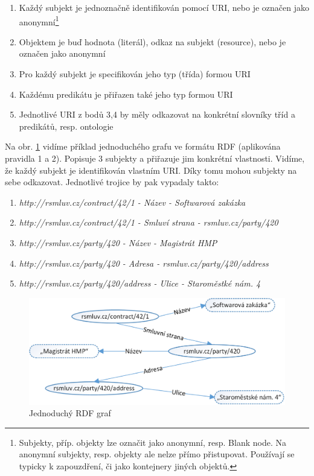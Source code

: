 \begin{enumerate}
\item Každý subjekt je jednoznačně identifikován pomocí URI, nebo je označen jako anonymní\footnote{Subjekty, příp. objekty lze označit jako anonymní, resp. Blank node. Na anonymní subjekty, resp. objekty ale nelze přímo přistupovat. Používají se typicky k zapouzdření, či jako kontejnery jiných objektů.} 
\item Objektem je buď hodnota (literál), odkaz na subjekt (resource), nebo je označen jako anonymní
\item Pro každý subjekt je specifikován jeho typ (třída) formou URI
\item Každému predikátu je přiřazen také jeho typ formou URI
\item Jednotlivé URI z bodů 3,4 by měly odkazovat na konkrétní slovníky tříd a predikátů, resp. ontologie
\end{enumerate}

Na obr. \ref{obr:rdf_graph} vidíme příklad jednoduchého grafu ve formátu RDF (aplikována pravidla 1 a 2). Popisuje 3 subjekty a přiřazuje jim konkrétní vlastnosti. Vidíme, že každý subjekt je identifikován vlastním URI. Díky tomu mohou subjekty na sebe odkazovat. Jednotlivé trojice by pak vypadaly takto:

\begin{enumerate}
\item \textit{http://rsmluv.cz/contract/42/1 - Název - Softwarová zakázka}   
\item \textit{http://rsmluv.cz/contract/42/1 - Smluví strana - rsmluv.cz/party/420}
\item \textit{http://rsmluv.cz/party/420 - Název - Magistrát HMP}
\item \textit{http://rsmluv.cz/party/420 - Adresa - rsmluv.cz/party/420/address}
\item \textit{http://rsmluv.cz/party/420/address - Ulice - Staroměstké nám. 4}
\end{enumerate}

\begin{figure}[h]
\centerline{\includegraphics[width=\textwidth]{img/rdf_graph.eps}}
\caption{Jednoduchý RDF graf}
\label{obr:rdf_graph}
\end{figure}

